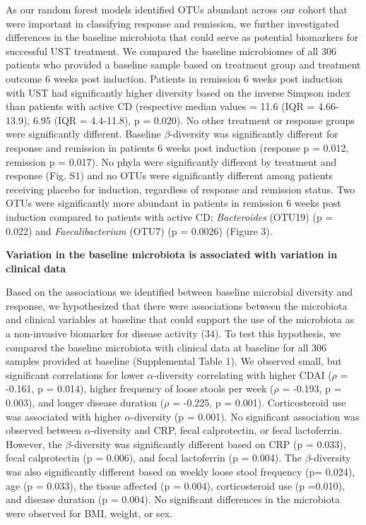 \documentclass[12pt,]{article}
\begin{document}
As our random forest models identified OTUs abundant across our cohort
that were important in classifying response and remission, we further
investigated differences in the baseline microbiota that could serve as
potential biomarkers for successful UST treatment. We compared the
baseline microbiomes of all 306 patients who provided a baseline sample
based on treatment group and treatment outcome 6 weeks post induction.
Patients in remission 6 weeks post induction with UST had significantly
higher diversity based on the inverse Simpson index than patients with
active CD (respective median values = 11.6 (IQR = 4.66-13.9), 6.95 (IQR
= 4.4-11.8), p = 0.020). No other treatment or response groups were
significantly different. Baseline \({\beta}\)-diversity was
significantly different for response and remission in patients 6 weeks
post induction (response p = 0.012, remission p = 0.017). No phyla were
significantly different by treatment and response (Fig. S1) and no OTUs
were significantly different among patients receiving placebo for
induction, regardless of response and remission status. Two OTUs were
significantly more abundant in patients in remission 6 weeks post
induction compared to patients with active CD; \emph{Bacteroides}
(OTU19) (p = 0.022) and \emph{Faecalibacterium} (OTU7) (p = 0.0026)
(Figure 3).

\textbf{Variation in the baseline microbiota is associated with
variation in clinical data}

Based on the associations we identified between baseline microbial
diversity and response, we hypothesized that there were associations
between the microbiota and clinical variables at baseline that could
support the use of the microbiota as a non-invasive biomarker for
disease activity (34). To test this hypothesis, we compared the baseline
microbiota with clinical data at baseline for all 306 samples provided
at baseline (Supplemental Table 1). We observed small, but significant
correlations for lower \({\alpha}\)-diversity correlating with higher
CDAI (\({\rho}\) = -0.161, p = 0.014), higher frequency of loose stools
per week (\({\rho}\) = -0.193, p = 0.003), and longer disease duration
(\({\rho}\) = -0.225, p = 0.001). Corticosteroid use was associated with
higher \({\alpha}\)-diversity (p = 0.001). No significant association
was observed between \({\alpha}\)-diversity and CRP, fecal calprotectin,
or fecal lactoferrin. However, the \({\beta}\)-diversity was
significantly different based on CRP (p = 0.033), fecal calprotectin (p
= 0.006), and fecal lactoferrin (p = 0.004). The \({\beta}\)-diversity
was also significantly different based on weekly loose stool frequency
(p= 0.024), age (p = 0.033), the tissue affected (p = 0.004),
corticosteroid use (p =0.010), and disease duration (p = 0.004). No
significant differences in the microbiota were observed for BMI, weight,
or sex.
\end{document}
